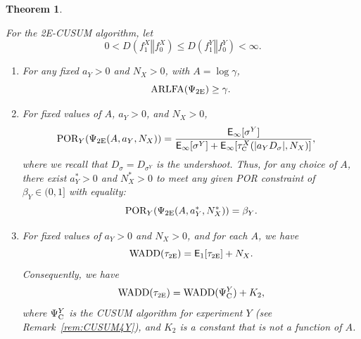 \documentclass[journal, onecolumn]{IEEEtran}
\newtheorem{theorem}{Theorem}
\begin{document}
\begin{theorem}
\label{thm:2e}

For the \textup{2E-CUSUM} algorithm, let
$$ 0 < D(f_1^X \mathrel{\Vert} f_0^X) \leq D(f_1^Y \mathrel{\Vert} f_0^Y) < \infty. $$

\begin{enumerate}
\item For any fixed $a_Y > 0$ and $N_X > 0$, with $A = \log \gamma$,
$$ \textup{ARLFA} (\Psi_{\textup{2E}}) \geq \gamma. $$

\item For fixed values of $A$, $a_Y > 0$, and $N_X > 0$,
\begin{align*}
& \textup{POR}_Y (\Psi_{\textup{2E}} (A, a_Y, N_X)) = \frac{\mathsf{E}_\infty [\sigma^Y]}{\mathsf{E}_\infty [\sigma^Y] + \mathsf{E}_\infty [\tau_{\textup{\fontsize{6 pt}{10 pt}\selectfont C}}^X (\vert a_Y D_\sigma \vert, N_X)]},
\end{align*}
where we recall that $D_\sigma = D_{\sigma^Y}$ is the undershoot. Thus, for any choice of $A$, there exist $a_Y^* > 0$ and $N_X^*>0$ to meet any given POR constraint of $\beta_Y \in (0, 1]$ with equality:
$$ \textup{POR}_Y (\Psi_{\textup{2E}} (A, a_Y^*, N_X^*)) = \beta_Y. $$

\item For fixed values of $a_Y > 0$ and $N_X > 0$, and for each $A$, we have
$$ \textup{WADD} (\tau_{\textup{\fontsize{6 pt}{10 pt}\selectfont 2E}}) = \mathsf{E}_1 [\tau_{\textup{\fontsize{6 pt}{10 pt}\selectfont 2E}}] + N_X. $$
Consequently, we have 
$$ \textup{WADD} (\tau_{\textup{\fontsize{6 pt}{10 pt}\selectfont 2E}}) = \textup{WADD} (\Psi_{\textup{C}}^Y) + K_2, $$
where $\Psi_{\textup{C}}^Y$ is the \textup{CUSUM} algorithm for experiment $Y$ (see Remark~\ref{rem:CUSUM4Y}), and $K_2$ is a constant that is not a function of $A$. 
\end{enumerate}
\end{theorem}
\end{document}
